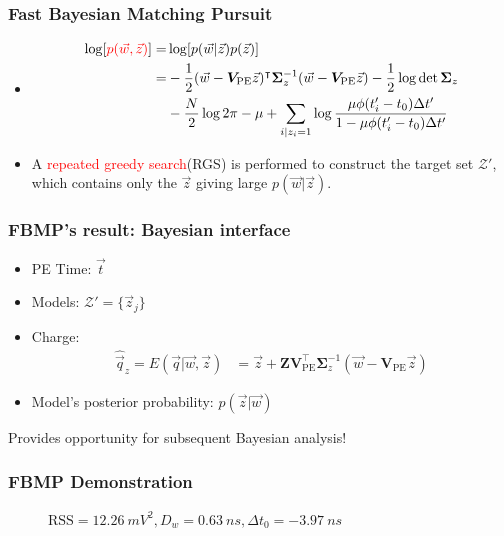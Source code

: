 \documentclass{beamer}
\begin{document}
\begin{frame}
\frametitle{Fast Bayesian Matching Pursuit}
\begin{itemize}
    \item \begin{align*}
        \log[\textcolor{red}{p(\vec{w},\vec{z})}] =& \log[p(\vec{w}|\vec{z})p(\vec{z})] \\
        =& -\frac{1}{2}(\vec{w}-\bm{V}_\mathrm{PE}\vec{z})^\intercal\bm{\Sigma}_z^{-1}(\vec{w}-\bm{V}_\mathrm{PE}\vec{z})-\frac{1}{2}\log\det\bm{\Sigma}_z \\ 
        &-\frac{N}{2}\log2\pi -\mu + \sum_{i|z_i=1}\log \frac{\mu \phi(t'_i - t_0) \Delta t'}{1-\mu \phi(t'_i - t_0) \Delta t'}
        \end{align*}
    \item A \textcolor{red}{repeated greedy search}(RGS) is performed to construct the target set $\mathcal{Z}'$, which contains only the $\vec{z}$ giving large $p(\vec{w}|\vec{z})$. 
\end{itemize}
\end{frame}

\begin{frame}
\frametitle{FBMP's result: Bayesian interface}
\begin{itemize}
    \item PE Time: $\vec{t}$
    \item Models: $\mathcal{Z}'=\{\vec{z}_j\}$
    \item Charge: \begin{align*}
        \hat{\vec{q}}_z = E(\vec{q}|\vec{w},\vec{z}) &= \vec{z} + \bm{Z}\bm{V}_\mathrm{PE}^\intercal\bm{\Sigma}_z^{-1}(\vec{w}-\bm{V}_\mathrm{PE}\vec{z})
        \end{align*}
    \item Model's posterior probability: $p(\vec{z}|\vec{w})$
\end{itemize}
\begin{center}
    Provides opportunity for subsequent Bayesian analysis! 
\end{center}
\end{frame}

\begin{frame}
\frametitle{FBMP Demonstration}
\begin{figure}
    \centering
    \resizebox{0.6\textwidth}{!}{}
    \caption{$\mathrm{RSS}=\SI{12.26}{mV^2},D_w=\SI{0.63}{ns},\Delta t_0=\SI{-3.97}{ns}$}
\end{figure}
\end{frame}
\end{document}
